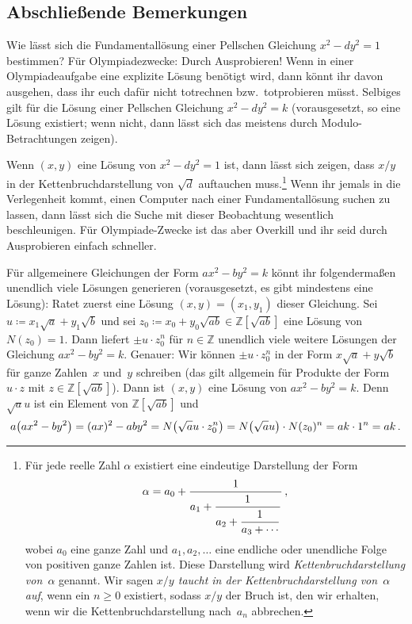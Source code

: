 \subsection*{Abschließende Bemerkungen}
Wie lässt sich die Fundamentallösung einer Pellschen Gleichung $x^2-dy^2=1$ bestimmen? Für Olympiadezwecke: Durch Ausprobieren! Wenn in einer Olympiadeaufgabe eine explizite Lösung benötigt wird, dann könnt ihr davon ausgehen, dass ihr euch dafür nicht totrechnen bzw.\ totprobieren müsst. Selbiges gilt für die Lösung einer Pellschen Gleichung $x^2-dy^2=k$ (vorausgesetzt, so eine Lösung existiert; wenn nicht, dann lässt sich das meistens durch Modulo-Betrachtungen zeigen).

Wenn $(x,y)$ eine Lösung von $x^2-dy^2=1$ ist, dann lässt sich zeigen, dass $x/y$ in der Kettenbruchdarstellung von $\sqrt{d}$ auftauchen muss.\footnote{Für jede reelle Zahl $\alpha$ existiert eine eindeutige Darstellung der Form
	\begin{equation*}
		\alpha=a_0+\frac{1}{\displaystyle a_1+\frac{1^{\vphantom{t}}}{\displaystyle a_2+\frac{1^{\vphantom{t}}}{a_3+\dotsb}}}\,,
	\end{equation*}
	wobei $a_0$ eine ganze Zahl und $a_1,a_2,\dotsc$ eine endliche oder unendliche Folge von positiven ganze Zahlen ist. Diese Darstellung wird \emph{Kettenbruchdarstellung von~$\alpha$} genannt. Wir sagen \emph{$x/y$ taucht in der Kettenbruchdarstellung von~$\alpha$ auf}, wenn ein $n\geqslant 0$ existiert, sodass $x/y$ der Bruch ist, den wir erhalten, wenn wir die Kettenbruchdarstellung nach~$a_n$ abbrechen.} Wenn ihr jemals in die Verlegenheit kommt, einen Computer nach einer Fundamentallösung suchen zu lassen, dann lässt sich die Suche mit dieser Beobachtung wesentlich beschleunigen. Für Olympiade-Zwecke ist das aber Overkill und ihr seid durch Ausprobieren einfach schneller.

Für allgemeinere Gleichungen der Form $ax^2-by^2=k$ könnt ihr folgendermaßen unendlich viele Lösungen generieren (vorausgesetzt, es gibt mindestens eine Lösung): Ratet zuerst eine Lösung $(x,y)=(x_1,y_1)$ dieser Gleichung. Sei $u\coloneqq x_1\sqrt{a}+y_1\sqrt{b}$ und sei $z_0\coloneqq x_0+y_0\sqrt{ab}\in\mathbb Z[\sqrt{ab}]$ eine Lösung von $N(z_0)=1$. Dann liefert $\pm u\cdot z_0^n$ für $n\in\mathbb Z$ unendlich viele weitere Lösungen der Gleichung $ax^2-by^2=k$. Genauer: Wir können $\pm u\cdot z_0^n$ in der Form $x\sqrt{a}+y\sqrt{b}$ für ganze Zahlen~$x$ und~$y$ schreiben (das gilt allgemein für Produkte der Form $u\cdot z$ mit $z\in\mathbb Z[\sqrt{ab}]$). Dann ist $(x,y)$ eine Lösung von $ax^2-by^2=k$. Denn $\sqrt{a} u$ ist ein Element von $\mathbb Z[\sqrt{ab}]$ und
\begin{equation*}
	a\parens*{ax^2-by^2}=(ax)^2-aby^2=N\parens*{\sqrt{a} u\cdot z_0^n}=N\parens*{\sqrt{a}u}\cdot N(z_0)^n=ak\cdot 1^n=ak\,.
\end{equation*}

